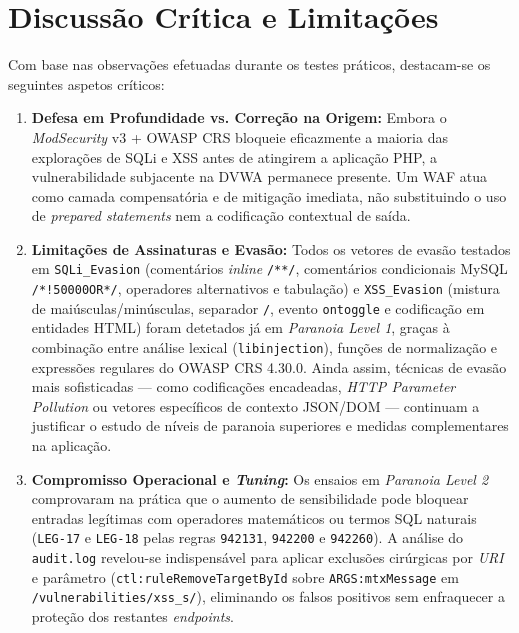 \documentclass[11pt,a4paper]{article}
\begin{document}
\clearpage
\section{Discussão Crítica e Limitações}
\label{sec:discussao}

Com base nas observações efetuadas durante os testes práticos, destacam-se os seguintes aspetos críticos:
\begin{enumerate}
    \item \textbf{Defesa em Profundidade vs. Correção na Origem:} Embora o \textit{ModSecurity} v3 + OWASP CRS bloqueie eficazmente a maioria das explorações de SQLi e XSS antes de atingirem a aplicação PHP, a vulnerabilidade subjacente na DVWA permanece presente. Um WAF atua como camada compensatória e de mitigação imediata, não substituindo o uso de \textit{prepared statements} nem a codificação contextual de saída.
    \item \textbf{Limitações de Assinaturas e Evasão:} Todos os vetores de evasão testados em \texttt{SQLi\_Evasion} (comentários \textit{inline} \texttt{/**/}, comentários condicionais MySQL \texttt{/*!50000OR*/}, operadores alternativos e tabulação) e \texttt{XSS\_Evasion} (mistura de maiúsculas/minúsculas, separador \texttt{/}, evento \texttt{ontoggle} e codificação em entidades HTML) foram detetados já em \textit{Paranoia Level 1}, graças à combinação entre análise lexical (\texttt{libinjection}), funções de normalização e expressões regulares do OWASP CRS 4.30.0. Ainda assim, técnicas de evasão mais sofisticadas --- como codificações encadeadas, \textit{HTTP Parameter Pollution} ou vetores específicos de contexto JSON/DOM --- continuam a justificar o estudo de níveis de paranoia superiores e medidas complementares na aplicação.
    \item \textbf{Compromisso Operacional e \textit{Tuning}:} Os ensaios em \textit{Paranoia Level 2} comprovaram na prática que o aumento de sensibilidade pode bloquear entradas legítimas com operadores matemáticos ou termos SQL naturais (\texttt{LEG-17} e \texttt{LEG-18} pelas regras \texttt{942131}, \texttt{942200} e \texttt{942260}). A análise do \texttt{audit.log} revelou-se indispensável para aplicar exclusões cirúrgicas por \textit{URI} e parâmetro (\texttt{ctl:ruleRemoveTargetById} sobre \texttt{ARGS:mtxMessage} em \texttt{/vulnerabilities/xss\_s/}), eliminando os falsos positivos sem enfraquecer a proteção dos restantes \textit{endpoints}.

\end{enumerate}
\end{document}
